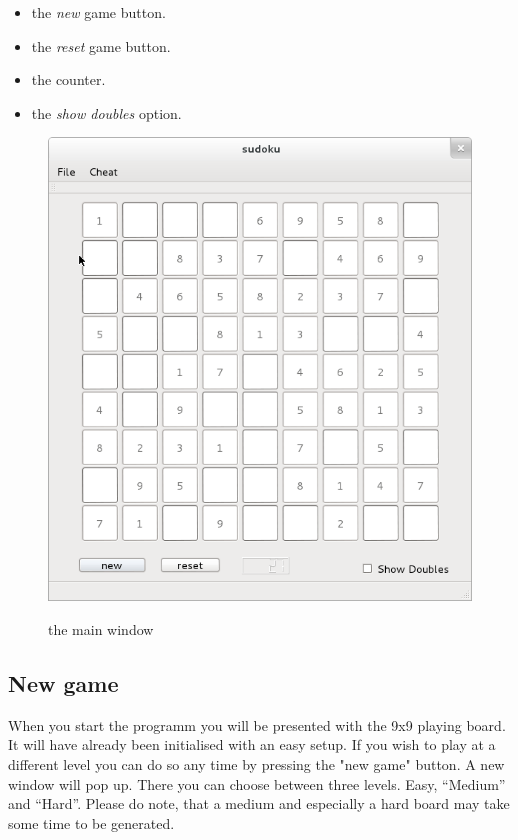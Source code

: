 \documentclass[a4paper,11pt]{article}
\begin{document}
\begin{itemize}
  \item the \textit{new} game button.
  \item the \textit{reset} game button.
  \item the counter.
  \item the \textit{show doubles} option. 
\end{itemize}


\begin{figure}[H]
  \begin{center}
    \includegraphics{img/mainWindow.png}
    \label{fig:}
    \caption{the main window}
  \end{center}
\end{figure}

\subsection{New game}
When you start the programm you will be presented with the 9x9 playing board. It will have already been initialised with an easy setup. If you wish to play at a different level you can do so any time by pressing the "new game" button. A new window will pop up. There you can choose between three levels. Easy, ``Medium'' and ``Hard''. Please do note, that a medium and especially a hard board may take some time to be generated. 
\end{document}
